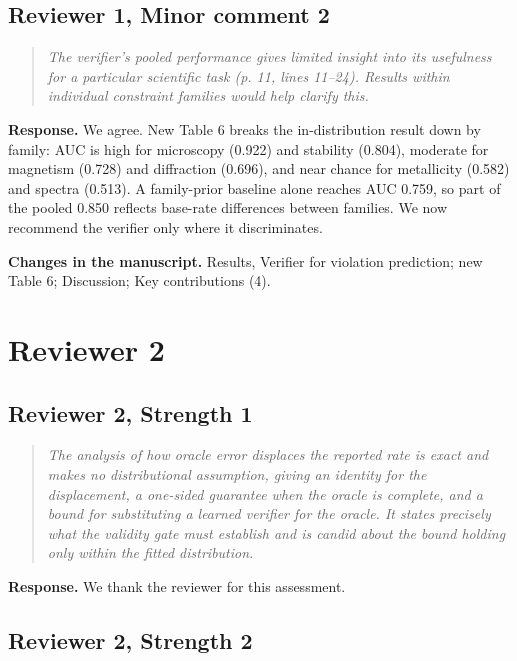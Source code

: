 \documentclass[11pt,a4paper]{article}
\newenvironment{reviewer}{\begin{quote}\itshape\small}{\end{quote}}
\begin{document}
\subsection*{Reviewer 1, Minor comment 2}

\begin{reviewer}The verifier’s pooled performance gives limited insight into its usefulness for a particular scientific task (p. 11, lines 11–24). Results within individual constraint families would help clarify this.\end{reviewer}

\textbf{Response.} We agree. New Table 6 breaks the in-distribution result down by family: AUC is high for microscopy (0.922) and stability (0.804), moderate for magnetism (0.728) and diffraction (0.696), and near chance for metallicity (0.582) and spectra (0.513). A family-prior baseline alone reaches AUC 0.759, so part of the pooled 0.850 reflects base-rate differences between families. We now recommend the verifier only where it discriminates.

\textbf{Changes in the manuscript.} Results, Verifier for violation prediction; new Table 6; Discussion; Key contributions (4).

\section*{Reviewer 2}

\subsection*{Reviewer 2, Strength 1}

\begin{reviewer}The analysis of how oracle error displaces the reported rate is exact and makes no distributional assumption, giving an identity for the displacement, a one-sided guarantee when the oracle is complete, and a bound for substituting a learned verifier for the oracle. It states precisely what the validity gate must establish and is candid about the bound holding only within the fitted distribution.\end{reviewer}

\textbf{Response.} We thank the reviewer for this assessment.

\subsection*{Reviewer 2, Strength 2}
\end{document}
